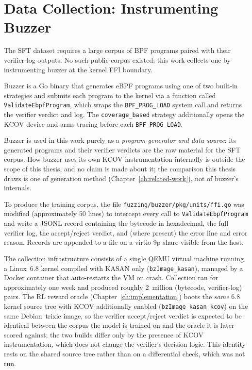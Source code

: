 \section{Data Collection: Instrumenting Buzzer}
\label{sec:buzzer-data}

The SFT dataset requires a large corpus of BPF programs paired with their
verifier-log outputs.
No such public corpus existed; this work collects one by instrumenting buzzer at
the kernel FFI boundary.

Buzzer is a Go binary that generates eBPF programs using one of two built-in
strategies and submits each program to the kernel via a function called
\texttt{ValidateEbpfProgram}, which wraps the \texttt{BPF\_PROG\_LOAD} system
call and returns the verifier verdict and log.
The \texttt{coverage\_based} strategy additionally opens the KCOV device and
arms tracing before each \texttt{BPF\_PROG\_LOAD}.

Buzzer is used in this work purely as a \emph{program generator and data source}:
its generated programs and their verifier verdicts are the raw material for the
SFT corpus. How buzzer uses its own KCOV instrumentation internally is outside the
scope of this thesis, and no claim is made about it; the comparison this thesis
draws is one of generation method (Chapter~\ref{ch:related-work}), not of buzzer's
internals.

To produce the training corpus, the file
\texttt{fuzzing/buzzer/pkg/units/ffi.go} was modified (approximately 50 lines)
to intercept every call to \texttt{ValidateEbpfProgram} and write a JSONL record
containing the bytecode in hexadecimal, the full verifier log, the
accept/reject verdict, and (where present) the error line and error reason.
Records are appended to a file on a virtio-9p share visible from the host.

The collection infrastructure consists of a single QEMU virtual machine running
a Linux~6.8 kernel compiled with KASAN only (\texttt{bzImage\_kasan}), managed
by a Docker container that auto-restarts the VM on crash.
Collection ran for approximately one week and produced roughly 2~million
(bytecode, verifier-log) pairs.
The RL reward oracle (Chapter~\ref{ch:implementation}) boots the \emph{same} 6.8
kernel source tree with KCOV additionally enabled (\texttt{bzImage\_kasan\_kcov})
on the same Debian~trixie image, so the verifier accept/reject verdict is expected
to be identical between the corpus the model is trained on and the oracle it is
later scored against; the two builds differ only by the presence of KCOV
instrumentation, which does not change the verifier's decision logic. This identity
rests on the shared source tree rather than on a differential check, which was not
run.

